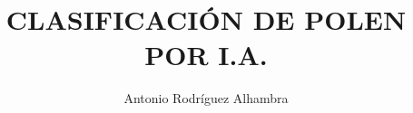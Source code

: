 
\title{CLASIFICACIÓN DE POLEN POR I.A.}
\author{Antonio Rodríguez Alhambra}










\address{UCLM --- Escuela de Ingeniería Industrial y Aeroespacial\\
    Campus Universitario de la Real Fábrica de Armas}
